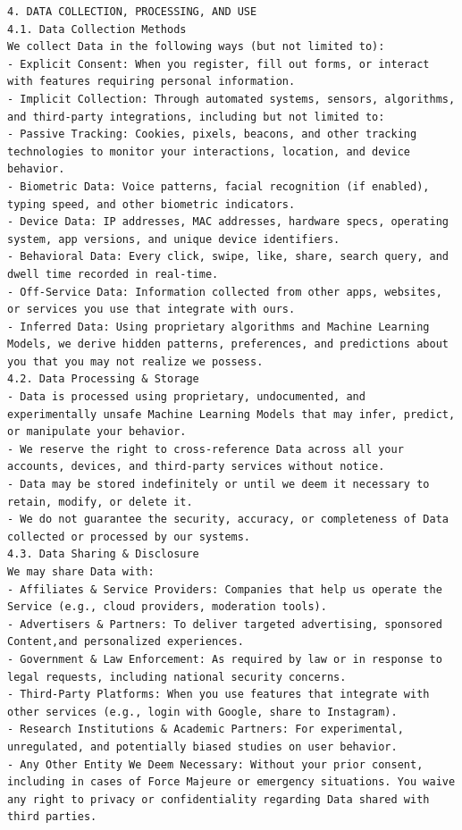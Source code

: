 \documentclass[manuscript,review,anonymous]{acmart}
\begin{document}
\begin{lstlisting}[frame=single,upquote=false,breaklines=true,columns=fullflexible,columns=fullflexible,columns=fullflexible,breakindent=0pt,basicstyle=\ttfamily\small]
4. DATA COLLECTION, PROCESSING, AND USE
4.1. Data Collection Methods
We collect Data in the following ways (but not limited to):
- Explicit Consent: When you register, fill out forms, or interact with features requiring personal information.
- Implicit Collection: Through automated systems, sensors, algorithms, and third-party integrations, including but not limited to:
- Passive Tracking: Cookies, pixels, beacons, and other tracking technologies to monitor your interactions, location, and device behavior.
- Biometric Data: Voice patterns, facial recognition (if enabled), typing speed, and other biometric indicators.
- Device Data: IP addresses, MAC addresses, hardware specs, operating system, app versions, and unique device identifiers.
- Behavioral Data: Every click, swipe, like, share, search query, and dwell time recorded in real-time.
- Off-Service Data: Information collected from other apps, websites, or services you use that integrate with ours.
- Inferred Data: Using proprietary algorithms and Machine Learning Models, we derive hidden patterns, preferences, and predictions about you that you may not realize we possess.
4.2. Data Processing & Storage
- Data is processed using proprietary, undocumented, and experimentally unsafe Machine Learning Models that may infer, predict, or manipulate your behavior.
- We reserve the right to cross-reference Data across all your accounts, devices, and third-party services without notice.
- Data may be stored indefinitely or until we deem it necessary to retain, modify, or delete it.
- We do not guarantee the security, accuracy, or completeness of Data collected or processed by our systems.
4.3. Data Sharing & Disclosure
We may share Data with:
- Affiliates & Service Providers: Companies that help us operate the Service (e.g., cloud providers, moderation tools).
- Advertisers & Partners: To deliver targeted advertising, sponsored Content,and personalized experiences.
- Government & Law Enforcement: As required by law or in response to legal requests, including national security concerns.
- Third-Party Platforms: When you use features that integrate with other services (e.g., login with Google, share to Instagram).
- Research Institutions & Academic Partners: For experimental, unregulated, and potentially biased studies on user behavior.
- Any Other Entity We Deem Necessary: Without your prior consent, including in cases of Force Majeure or emergency situations. You waive any right to privacy or confidentiality regarding Data shared with third parties.


\end{lstlisting}
\end{document}
